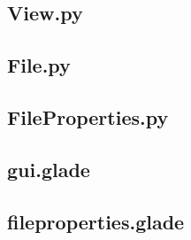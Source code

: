\documentclass[10pt,paper=a4,final]{scrartcl}
\begin{document}
\subsection{View.py}

\subsection{File.py}

\subsection{FileProperties.py}

\subsection{gui.glade}

\subsection{fileproperties.glade}

\end{document}
